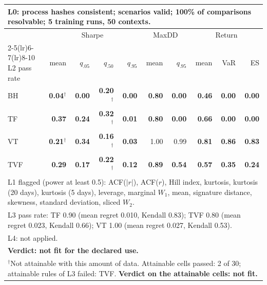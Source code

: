 \begin{tabular}{lrrrrrrrrr}
\toprule
\multicolumn{10}{p{13.5cm}}{L0: process hashes consistent; scenarios valid; 100\% of comparisons resolvable; 5 training runs, 50 contexts.} \\
\midrule
 & \multicolumn{4}{c}{Sharpe} & \multicolumn{2}{c}{MaxDD} & \multicolumn{3}{c}{Return} \\
\cmidrule(lr){2-5}\cmidrule(lr){6-7}\cmidrule(lr){8-10}
L2 pass rate & mean & $q_{.05}$ & $q_{.50}$ & $q_{.95}$ & mean & $q_{.95}$ & mean & VaR & ES \\
\midrule
BH & \textbf{0.04}$^{\dagger}$ & \textbf{0.00} & \textbf{0.20}$^{\dagger}$ & \textbf{0.00} & \textbf{0.80} & \textbf{0.00} & \textbf{0.46} & \textbf{0.00} & \textbf{0.00} \\
TF & \textbf{0.37} & \textbf{0.24} & \textbf{0.32}$^{\dagger}$ & \textbf{0.01} & \textbf{0.80} & \textbf{0.00} & \textbf{0.66} & \textbf{0.00} & \textbf{0.00} \\
VT & \textbf{0.21}$^{\dagger}$ & \textbf{0.34} & \textbf{0.16}$^{\dagger}$ & \textbf{0.03} & 1.00 & 0.99 & \textbf{0.81} & \textbf{0.86} & \textbf{0.83} \\
TVF & \textbf{0.29} & \textbf{0.17} & \textbf{0.22}$^{\dagger}$ & \textbf{0.12} & \textbf{0.89} & \textbf{0.54} & \textbf{0.57} & \textbf{0.35} & \textbf{0.24} \\
\midrule
\multicolumn{10}{p{13.5cm}}{L1 flagged (power at least 0.5): ACF($|r|$), ACF($r$), Hill index, kurtosis, kurtosis (20 days), kurtosis (5 days), leverage, marginal $W_1$, mean, signature distance, skewness, standard deviation, sliced $W_2$.} \\
\multicolumn{10}{p{13.5cm}}{L3 pass rate: TF 0.90 (mean regret 0.010, Kendall 0.83); TVF 0.80 (mean regret 0.023, Kendall 0.66); VT 1.00 (mean regret 0.027, Kendall 0.53).} \\
\multicolumn{10}{p{13.5cm}}{L4: not applied.} \\
\multicolumn{10}{p{13.5cm}}{\textbf{Verdict: not fit for the declared use.}} \\
\multicolumn{10}{p{13.5cm}}{$^{\dagger}$Not attainable with this amount of data. Attainable cells passed: 2 of 30; attainable rules of L3 failed: TVF. \textbf{Verdict on the attainable cells: not fit.}} \\
\bottomrule
\end{tabular}
